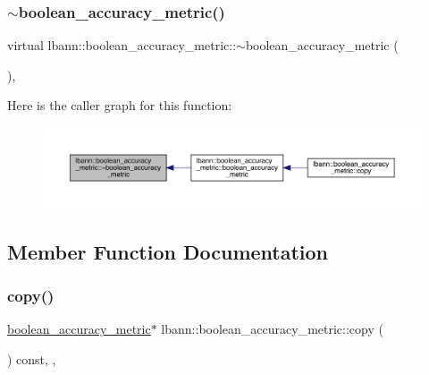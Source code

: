 \mbox{\label{classlbann_1_1boolean__accuracy__metric_a08f019909aa96a49a48d29fd8c2d1df4}} 
\subsubsection{\texorpdfstring{$\sim$boolean\+\_\+accuracy\+\_\+metric()}{~boolean\_accuracy\_metric()}}
{\footnotesize\ttfamily virtual lbann\+::boolean\+\_\+accuracy\+\_\+metric\+::$\sim$boolean\+\_\+accuracy\+\_\+metric (\begin{DoxyParamCaption}{ }\end{DoxyParamCaption})\hspace{0.3cm}{\ttfamily [virtual]}, {\ttfamily [default]}}

Here is the caller graph for this function\+:\nopagebreak
\begin{figure}[H]
\begin{center}
\leavevmode
\includegraphics[width=350pt]{classlbann_1_1boolean__accuracy__metric_a08f019909aa96a49a48d29fd8c2d1df4_icgraph}
\end{center}
\end{figure}


\subsection{Member Function Documentation}
\mbox{\label{classlbann_1_1boolean__accuracy__metric_ae3a97a9ac1caccfe8ac46ad1a0df01a4}} 
\subsubsection{\texorpdfstring{copy()}{copy()}}
{\footnotesize\ttfamily \hyperlink{classlbann_1_1boolean__accuracy__metric}{boolean\+\_\+accuracy\+\_\+metric}$\ast$ lbann\+::boolean\+\_\+accuracy\+\_\+metric\+::copy (\begin{DoxyParamCaption}{ }\end{DoxyParamCaption}) const\hspace{0.3cm}{\ttfamily [inline]}, {\ttfamily [override]}, {\ttfamily [virtual]}}

